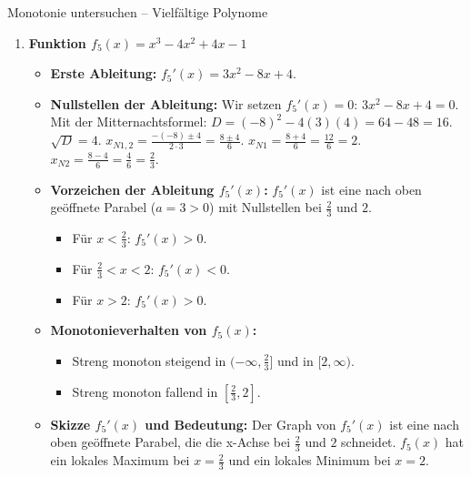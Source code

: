 \begin{loesungsumgebung}{Monotonie untersuchen – Vielfältige Polynome}
\begin{enumerate}[label=(\alph*)]
    \item \textbf{Funktion $f_5(x) = x^3 - 4x^2 + 4x - 1$}
    \begin{itemize}
        \item \textbf{Erste Ableitung:} $f_5'(x) = 3x^2 - 8x + 4$.
        \item \textbf{Nullstellen der Ableitung:} Wir setzen $f_5'(x)=0$:
        $3x^2 - 8x + 4 = 0$.
        Mit der Mitternachtsformel: $D = (-8)^2 - 4(3)(4) = 64 - 48 = 16$. $\sqrt{D}=4$.
        $x_{N1,2} = \frac{-(-8) \pm 4}{2 \cdot 3} = \frac{8 \pm 4}{6}$.
        $x_{N1} = \frac{8+4}{6} = \frac{12}{6} = 2$.
        $x_{N2} = \frac{8-4}{6} = \frac{4}{6} = \frac{2}{3}$.
        \item \textbf{Vorzeichen der Ableitung $f_5'(x)$:}
        $f_5'(x)$ ist eine nach oben geöffnete Parabel ($a=3>0$) mit Nullstellen bei $\frac{2}{3}$ und $2$.
        \begin{itemize}
            \item Für $x < \frac{2}{3}$: $f_5'(x) > 0$.
            \item Für $\frac{2}{3} < x < 2$: $f_5'(x) < 0$.
            \item Für $x > 2$: $f_5'(x) > 0$.
        \end{itemize}
        \item \textbf{Monotonieverhalten von $f_5(x)$:}
        \begin{itemize}
            \item Streng monoton steigend in $(-\infty, \frac{2}{3}]$ und in $[2, \infty)$.
            \item Streng monoton fallend in $[\frac{2}{3}, 2]$.
        \end{itemize}
        \item \textbf{Skizze $f_5'(x)$ und Bedeutung:} Der Graph von $f_5'(x)$ ist eine nach oben geöffnete Parabel, die die x-Achse bei $\frac{2}{3}$ und $2$ schneidet. $f_5(x)$ hat ein lokales Maximum bei $x=\frac{2}{3}$ und ein lokales Minimum bei $x=2$.
    \end{itemize}


\end{enumerate}
\end{loesungsumgebung}
